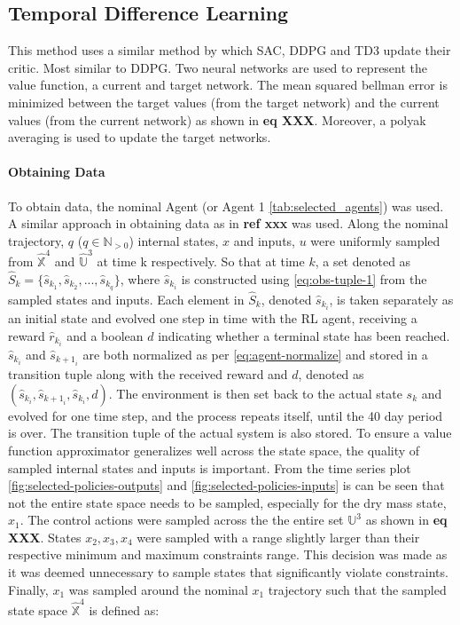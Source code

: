 \subsection{Temporal Difference Learning}
\label{ssection:td-learning}
This method uses a similar method by which SAC, DDPG and TD3 update their critic. Most similar to DDPG. Two neural networks are used to represent the value function, a current and target network. The mean squared bellman error is minimized between the target values (from the target network) and the current values (from the current network) as shown in \textbf{eq XXX}. Moreover, a polyak averaging is used to update the target networks. 

\paragraph{Obtaining Data}
To obtain data, the nominal Agent (or Agent 1 \autoref{tab:selected_agents}) was used. A similar approach in obtaining data as in \textbf{ref xxx} was used. Along the nominal trajectory, $q$ ($q \in \mathbb{N}_{>0}$) internal states, $x$ and inputs, $u$ were uniformly sampled from $\hat{\mathbb{X}}^4$ and $\hat{\mathbb{U}}^3$ at time k respectively. So that at time $k$, a set denoted as $\hat{S}_{k} = \{\hat{s}_{k_1},\hat{s}_{k_2},...,\hat{s}_{k_q}\}$, where $\hat{s}_{k_i}$ is constructed using \autoref{eq:obs-tuple-1} from the sampled states and inputs. Each element in $\hat{S}_k$, denoted $\hat{s}_{k_i}$, is taken separately as an initial state and evolved one step in time with the RL agent, receiving a reward $\hat{r}_{k_i}$ and a boolean $d$ indicating whether a terminal state has been reached. $\hat{s}_{k_i}$ and $\hat{s}_{{k+1}_i}$ are both normalized as per \autoref{eq:agent-normalize} and stored in a transition tuple along with the received reward and $d$, denoted as $(\hat{s}_{k_i},\hat{s}_{{k+1}_i},\hat{s}_{k_i},d)$. The environment is then set back to the actual state $s_k$ and evolved for one time step, and the process repeats itself, until the 40 day period is over. The transition tuple of the actual system is also stored. To ensure a value function approximator generalizes well across the state space, the quality of sampled internal states and inputs is important. From the time series plot \autoref{fig:selected-policies-outputs} and \autoref{fig:selected-policies-inputs} is can be seen that not the entire state space needs to be sampled, especially for the dry mass state, $x_1$. The control actions were sampled across the the entire set $\mathbb{U}^3$ as shown in \textbf{eq XXX}. States $x_2,x_3,x_4$ were sampled with a range slightly larger than their respective minimum and maximum constraints range. This decision was made as it was deemed unnecessary to sample states that significantly violate constraints.  Finally, $x_1$ was sampled around the nominal $x_1$ trajectory such that the sampled state space $\hat{\mathbb{X}}^4$ is defined as:




